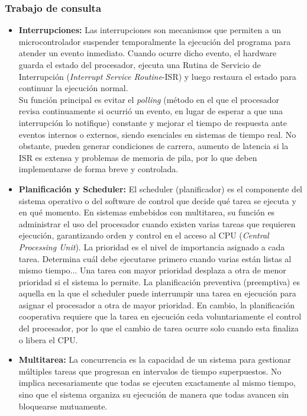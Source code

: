 \subsubsection{Trabajo de consulta}
\begin{itemize}
    \item \textbf{Interrupciones:} Las interrupciones son mecanismos que permiten a un microcontrolador suspender temporalmente la ejecución del programa para atender un evento inmediato. Cuando ocurre dicho evento, el hardware guarda el estado del procesador, ejecuta una Rutina de Servicio de Interrupción (\textit{Interrupt Service Routine}-ISR) y luego restaura el estado para continuar la ejecución normal.\\
    Su función principal es evitar el \textit{polling} (método en el que el procesador revisa continuamente si ocurrió un evento, en lugar de esperar a que una interrupción lo notifique) constante y mejorar el tiempo de respuesta ante eventos internos o externos, siendo esenciales en sistemas de tiempo real. \cite{valvano2011embedded} No obstante, pueden generar condiciones de carrera, aumento de latencia si la ISR es extensa y problemas de memoria de pila, por lo que deben implementarse de forma breve y controlada. \cite{buttazzo1997hard}   
    \vspace{0.3cm}
    \item \textbf{Planificación y Scheduler:}  El scheduler (planificador) es el componente del sistema operativo o del software de control que decide qué tarea se ejecuta y en qué momento. En sistemas embebidos con multitarea, su función es administrar el uso del procesador cuando existen varias tareas que requieren ejecución, garantizando orden y control en el acceso al CPU (\textit{Central Processing Unit}).\cite{buttazzo1997hard}
    La prioridad es el nivel de importancia asignado a cada tarea. Determina cuál debe ejecutarse primero cuando varias están listas al mismo tiempo... Una tarea con mayor prioridad desplaza a otra de menor prioridad si el sistema lo permite.
    La planificación preventiva (preemptiva) es aquella en la que el scheduler puede interrumpir una tarea en ejecución para asignar el procesador a otra de mayor prioridad. En cambio, la planificación cooperativa requiere que la tarea en ejecución ceda voluntariamente el control del procesador, por lo que el cambio de tarea ocurre solo cuando esta finaliza o libera el CPU. \cite{buttazzo1997hard}
    \vspace{0.3cm}
    \item \textbf{Multitarea:} La concurrencia es la capacidad de un sistema para gestionar múltiples tareas que progresan en intervalos de tiempo superpuestos. No implica necesariamente que todas se ejecuten exactamente al mismo tiempo, sino que el sistema organiza su ejecución de manera que todas avancen sin bloquearse mutuamente.\cite{buttazzo1997hard}

\end{itemize}
